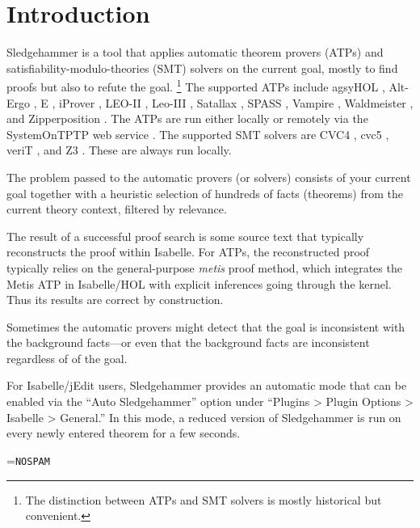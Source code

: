 \documentclass[a4paper,12pt]{article}
\renewcommand\_{\hbox{\textunderscore\kern-.05ex}}
\begin{document}
\section{Introduction}
\label{introduction}

Sledgehammer is a tool that applies automatic theorem provers (ATPs)
and satisfiability-modulo-theories (SMT) solvers on the current goal, mostly
to find proofs but also to refute the goal.%
\footnote{The distinction between ATPs and SMT solvers is mostly
historical but convenient.}
%
The supported ATPs include agsyHOL \cite{agsyHOL}, Alt-Ergo \cite{alt-ergo}, E
\cite{schulz-2019}, iProver \cite{korovin-2009}, LEO-II \cite{leo2}, Leo-III
\cite{leo3}, Satallax \cite{satallax}, SPASS \cite{weidenbach-et-al-2009},
Vampire \cite{riazanov-voronkov-2002}, Waldmeister \cite{waldmeister}, and
Zipperposition \cite{cruanes-2014}. The ATPs are run either locally or remotely
via the System\-On\-TPTP web service \cite{sutcliffe-2000}. The supported SMT
solvers are CVC4 \cite{cvc4}, cvc5 \cite{barbosa-et-al-cvc5}, veriT
\cite{bouton-et-al-2009}, and Z3 \cite{de-moura-2008}. These are always run
locally.

The problem passed to the automatic provers (or solvers) consists of your
current goal together with a heuristic selection of hundreds of facts (theorems)
from the current theory context, filtered by relevance.

The result of a successful proof search is some source text that typically
reconstructs the proof within Isabelle. For ATPs, the reconstructed proof
typically relies on the general-purpose \textit{metis} proof method, which
integrates the Metis ATP in Isabelle/HOL with explicit inferences going through
the kernel. Thus its results are correct by construction.

Sometimes the automatic provers might detect that the goal is inconsistent with
the background facts---or even that the background facts are inconsistent
regardless of of the goal.

For Isabelle/jEdit users, Sledgehammer provides an automatic mode that can be
enabled via the ``Auto Sledgehammer'' option under ``Plugins > Plugin Options >
Isabelle > General.'' In this mode, a reduced version of Sledgehammer is run on
every newly entered theorem for a few seconds.

\newbox\boxA
\setbox\boxA=\hbox{\texttt{NOSPAM}}

\newcommand\authoremail{\texttt{jasmin.blan{\color{white}NOSPAM}\kern-\wd\boxA{}chette@\allowbreak
gmail.\allowbreak com}}
\end{document}
